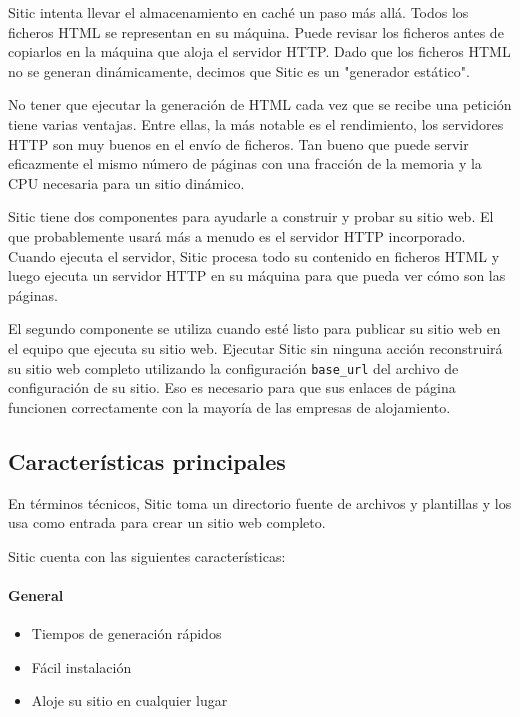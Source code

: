 Sitic intenta llevar el almacenamiento en caché un paso más allá. Todos los ficheros HTML se representan en su máquina.
Puede revisar los ficheros antes de copiarlos en la máquina que aloja el servidor HTTP. Dado que los ficheros HTML
no se generan dinámicamente, decimos que Sitic es un "generador estático".

No tener que ejecutar la generación de HTML cada vez que se recibe una petición tiene varias ventajas. Entre ellas,
la más notable es el rendimiento, los servidores HTTP son muy buenos en el envío de ficheros. Tan bueno que puede
servir eficazmente el mismo número de páginas con una fracción de la memoria y la CPU necesaria para un sitio dinámico.

Sitic tiene dos componentes para ayudarle a construir y probar su sitio web. El que probablemente usará más a menudo es el
servidor HTTP incorporado. Cuando ejecuta el servidor, Sitic procesa todo su contenido en ficheros HTML y luego ejecuta
un servidor HTTP en su máquina para que pueda ver cómo son las páginas.

El segundo componente se utiliza cuando esté listo para publicar su sitio web en el equipo que ejecuta su sitio web.
Ejecutar Sitic sin ninguna acción reconstruirá su sitio web completo utilizando la configuración \texttt{base\_url} del archivo de
configuración de su sitio. Eso es necesario para que sus enlaces de página funcionen correctamente con la mayoría
de las empresas de alojamiento.

\subsection{Características principales}

En términos técnicos, Sitic toma un directorio fuente de archivos y plantillas y los usa como entrada para crear un sitio web completo.

Sitic cuenta con las siguientes características:

\paragraph{General}

\begin{itemize}
\item Tiempos de generación rápidos
\item Fácil instalación
\item Aloje su sitio en cualquier lugar
\end{itemize}

